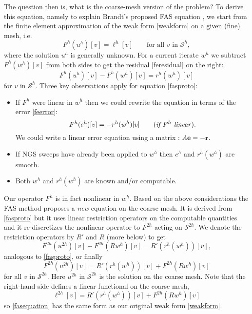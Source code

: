 \documentclass[letterpaper,final,12pt,reqno]{amsart}
\newcommand{\be}{\mathbf{e}}
\newcommand{\br}{\mathbf{r}}
\begin{document}
The question then is, what is the coarse-mesh version of the problem?  To derive this equation, namely to explain Brandt's proposed FAS equation \cite{Brandt1977}, we start from the finite element approximation of the weak form \eqref{weakform} on a given (fine) mesh, i.e.
\begin{equation}
  F^h(u^h)[v] = \ell^h[v] \qquad \text{for all } v \text{ in } \mathcal{S}^h,  \label{feweakform}
\end{equation}
where the solution $u^h$ is generally unknown.  For a current iterate $w^h$ we subtract $F^h(w^h)[v]$ from both sides to get the residual \eqref{feresidual} on the right:
\begin{equation}
  F^h(u^h)[v] - F^h(w^h)[v] = r^h(w^h)[v] \label{fasproto}
\end{equation}
for $v$ in $\mathcal{S}^h$.  Three key observations apply for equation \eqref{fasproto}:
\begin{itemize}
\item If $F^h$ were linear in $w^h$ then we could rewrite the equation in terms of the error \eqref{feerror}:
    $$F^h(e^h)[v] = -r^h(w^h)[v] \qquad (\text{\emph{if $F^h$ linear}}).$$
We could write a linear error equation using a matrix \cite[Chapter 2]{Bueler2021}: $A\be=-\br$.
\item If NGS sweeps have already been applied to $w^h$ then $e^h$ and $r^h(w^h)$ are smooth.
\item Both $w^h$ and $r^h(w^h)$ are known and/or computable.
\end{itemize}

Our operator $F^h$ is in fact nonlinear in $w^h$.  Based on the above considerations the FAS method proposes a \emph{new} equation on the coarse mesh.  It is derived from \eqref{fasproto} but it uses linear restriction operators on the computable quantities and it re-discretizes the nonlinear operator to $F^{2h}$ acting on $\mathcal{S}^{2h}$.  We denote the restriction operators by $R'$ and $R$ (more below) to get
\begin{equation}
  F^{2h}(u^{2h})[v] - F^{2h}(R w^h)[v] = R' (r^h(w^h))[v], \label{faspreequation}
\end{equation}
analogous to \eqref{fasproto}, or finally
\begin{equation}
  F^{2h}(u^{2h})[v] = R' (r^h(w^h))[v] + F^{2h}(R w^h)[v] \label{fasequation}
\end{equation}
for all $v$ in $\mathcal{S}^{2h}$.  Here $u^{2h}$ in $\mathcal{S}^{2h}$ is the solution on the coarse mesh.  Note that the right-hand side defines a linear functional on the coarse mesh,
\begin{equation}
  \ell^{2h}[v] = R' (r^h(w^h))[v] + F^{2h}(R w^h)[v] \label{fasell}
\end{equation}
so \eqref{fasequation} has the same form as our original weak form \eqref{weakform}.
\end{document}
